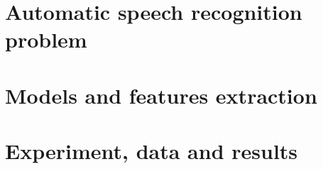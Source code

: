 \documentclass[a4paper]{report}
\theoremstyle{definition}
\theoremstyle{theorem}
\theoremstyle{algorithm}
\begin{document}
\title{}
\author{Piotr Kowenzowski}
\date{\today}

\newpage
\tableofcontents
\newpage

\begin{comment}
\begin{enumerate}
\item More complex DNN (6 depth, 2048 size)  
\begin{enumerate}
\item 20\% 35\% 50\% \ldots
\item CV less data (35? 50?) 
\end{enumerate}
\begin{enumerate}
\item MLT
\item Energy
\end{enumerate}
\item Deep models comparison
\begin{enumerate}
\item autoencoders
\item no pretraining
\item CNN
\end{enumerate}
\item nnet2
\begin{enumerate}
\item pnorm
\item relu vs sigmoid
\end{enumerate}
\item Discriminative training
\end{enumerate}
\end{comment}

\newpage

\listoftodos


\part{Automatic speech recognition problem}




%

\part{Models and features extraction}




\part{Experiment, data and results}





%



%


\printbibliography
\end{document}
